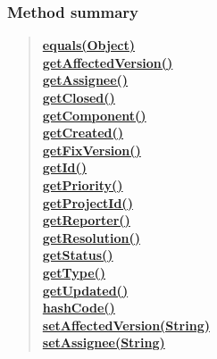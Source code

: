 {{\subsubsection{Method summary}{
\begin{verse}
\hyperlink{it.unisa.sesa.repominer.db.entities.Issue.equals(java.lang.Object)}{{\bf equals(Object)}} \\
\hyperlink{it.unisa.sesa.repominer.db.entities.Issue.getAffectedVersion()}{{\bf getAffectedVersion()}} \\
\hyperlink{it.unisa.sesa.repominer.db.entities.Issue.getAssignee()}{{\bf getAssignee()}} \\
\hyperlink{it.unisa.sesa.repominer.db.entities.Issue.getClosed()}{{\bf getClosed()}} \\
\hyperlink{it.unisa.sesa.repominer.db.entities.Issue.getComponent()}{{\bf getComponent()}} \\
\hyperlink{it.unisa.sesa.repominer.db.entities.Issue.getCreated()}{{\bf getCreated()}} \\
\hyperlink{it.unisa.sesa.repominer.db.entities.Issue.getFixVersion()}{{\bf getFixVersion()}} \\
\hyperlink{it.unisa.sesa.repominer.db.entities.Issue.getId()}{{\bf getId()}} \\
\hyperlink{it.unisa.sesa.repominer.db.entities.Issue.getPriority()}{{\bf getPriority()}} \\
\hyperlink{it.unisa.sesa.repominer.db.entities.Issue.getProjectId()}{{\bf getProjectId()}} \\
\hyperlink{it.unisa.sesa.repominer.db.entities.Issue.getReporter()}{{\bf getReporter()}} \\
\hyperlink{it.unisa.sesa.repominer.db.entities.Issue.getResolution()}{{\bf getResolution()}} \\
\hyperlink{it.unisa.sesa.repominer.db.entities.Issue.getStatus()}{{\bf getStatus()}} \\
\hyperlink{it.unisa.sesa.repominer.db.entities.Issue.getType()}{{\bf getType()}} \\
\hyperlink{it.unisa.sesa.repominer.db.entities.Issue.getUpdated()}{{\bf getUpdated()}} \\
\hyperlink{it.unisa.sesa.repominer.db.entities.Issue.hashCode()}{{\bf hashCode()}} \\
\hyperlink{it.unisa.sesa.repominer.db.entities.Issue.setAffectedVersion(java.lang.String)}{{\bf setAffectedVersion(String)}} \\
\hyperlink{it.unisa.sesa.repominer.db.entities.Issue.setAssignee(java.lang.String)}{{\bf setAssignee(String)}} \\

\end{verse}}}}
